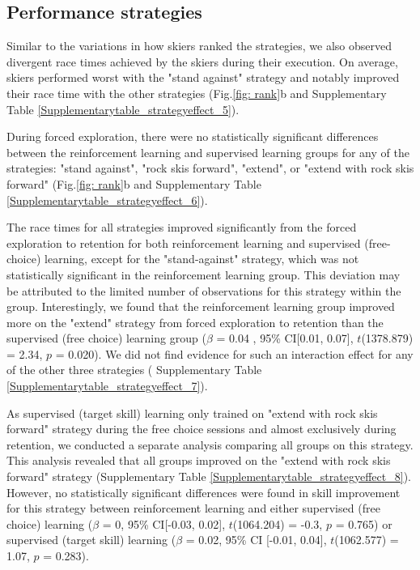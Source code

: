\documentclass[pdflatex,sn-mathphys-num]{sn-jnl}%
\theoremstyle{thmstyleone}%
\theoremstyle{thmstyletwo}%
\theoremstyle{thmstylethree}%
\begin{document}
\subsection{Performance strategies}\label{subsec5}
Similar to the variations in how skiers ranked the strategies, we also observed divergent race times achieved by the skiers during their execution. On average, skiers performed worst with the "stand against" strategy and notably improved their race time with the other strategies (Fig.\ref{fig: rank}b and Supplementary Table \ref{Supplementarytable_strategyeffect_5}). 

During forced exploration, there were no statistically significant differences between the reinforcement learning and supervised learning groups for any of the strategies:  "stand against", "rock skis forward", "extend", or "extend with rock skis forward" (Fig.\ref{fig: rank}b and Supplementary Table \ref{Supplementarytable_strategyeffect_6}). 

The race times for all strategies improved significantly from the forced exploration to retention for both reinforcement learning and supervised (free-choice) learning, except for the "stand-against" strategy, which was not statistically significant in the reinforcement learning group. This deviation may be attributed to the limited number of observations for this strategy within the group. Interestingly, we found that the reinforcement learning group improved more on the "extend" strategy from forced exploration to retention than the supervised (free choice) learning group ($\beta$ = 0.04 , 95\% CI[0.01, 0.07], $t$(1378.879) = 2.34, $p$ = 0.020). We did not find evidence for such an interaction effect for any of the other three strategies ( Supplementary Table \ref{Supplementarytable_strategyeffect_7}). 

As supervised (target skill) learning only trained on "extend with rock skis forward" strategy during the free choice sessions and almost exclusively during retention, we conducted a separate analysis comparing all groups on this strategy. This analysis revealed that all groups improved on the "extend with rock skis forward" strategy  (Supplementary Table \ref{Supplementarytable_strategyeffect_8}). However, no statistically significant differences were found in skill improvement for this strategy between reinforcement learning and either supervised (free choice) learning ($\beta$ = 0, 95\% CI[-0.03, 0.02], $t$(1064.204) = -0.3, $p$ = 0.765) or supervised (target skill) learning ($\beta$ = 0.02, 95\% CI [-0.01, 0.04], $t$(1062.577) = 1.07, $p$ = 0.283).
\end{document}
